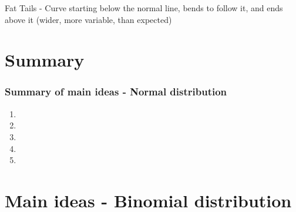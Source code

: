 \documentclass[11pt,containsverbatim,handout,xcolor=xelatex,dvipsnames,table]{beamer}
\begin{document}
\begin{frame}
\pause
{}
{
Fat Tails - Curve starting below the normal line, bends to follow it, and ends above it (wider, more variable, than expected)
}

\end{frame}


\section{Summary}


\begin{frame}
\frametitle{Summary of main ideas - Normal distribution}

\vfill

\begin{enumerate}

\item {}

\item {}

\item {}

\item {}

\item {}

\end{enumerate}

\vfill

\end{frame}


\section{Main ideas - Binomial distribution}
\end{document}
